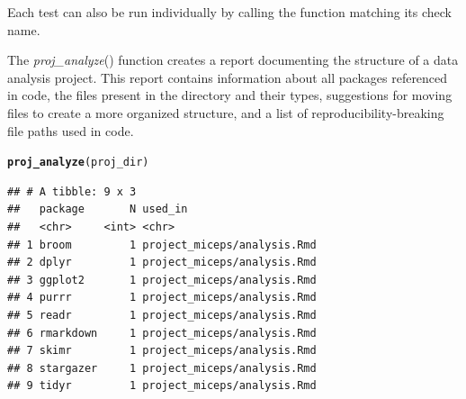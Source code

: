 \documentclass[APA,LATO1COL]{WileyNJD-v2}\usepackage[]{graphicx}\usepackage[]{color}
\makeatletter
\newcommand{\hlstd}[1]{\textcolor[rgb]{0.345,0.345,0.345}{#1}}%
\newcommand{\hlkwd}[1]{\textcolor[rgb]{0.737,0.353,0.396}{\textbf{#1}}}%
\newenvironment{kframe}{%
 \def\at@end@of@kframe{}%
 \ifinner\ifhmode%
  \def\at@end@of@kframe{\end{minipage}}%
  \begin{minipage}{\columnwidth}%
 \fi\fi%
 \def\FrameCommand##1{\hskip\@totalleftmargin \hskip-\fboxsep
 \colorbox{shadecolor}{##1}\hskip-\fboxsep
     \hskip-\linewidth \hskip-\@totalleftmargin \hskip\columnwidth}%
 \MakeFramed {\advance\hsize-\width
   \@totalleftmargin\z@ \linewidth\hsize
   \@setminipage}}%
 {\par\unskip\endMakeFramed%
 \at@end@of@kframe}
\newenvironment{knitrout}{}{} %
\newcommand{\func}[1]{\textit{#1}()}
\makeatother
\begin{document}
Each test can also be run individually by calling the function matching its check name.

The \func{proj\_analyze} function creates a report documenting the structure of a data analysis project. This report contains information about all packages referenced in code, the files present in the directory and their types, suggestions for moving files to create a more organized structure, and a list of reproducibility-breaking file paths used in code.

\begin{knitrout}
\color{fgcolor}\begin{kframe}
\begin{alltt}
\hlkwd{proj_analyze}\hlstd{(proj_dir)}
\end{alltt}


{\ttfamily\noindent\itshape\color{messagecolor}{\#\# -- Analysis of reproducibility for project\_miceps ------------ fertile 0.0.0.9027 --}}

{\ttfamily\noindent\itshape\color{messagecolor}{\#\# --\ \  Packages referenced in source code ---------------------- fertile 0.0.0.9027 --}}\begin{verbatim}
## # A tibble: 9 x 3
##   package       N used_in                    
##   <chr>     <int> <chr>                      
## 1 broom         1 project_miceps/analysis.Rmd
## 2 dplyr         1 project_miceps/analysis.Rmd
## 3 ggplot2       1 project_miceps/analysis.Rmd
## 4 purrr         1 project_miceps/analysis.Rmd
## 5 readr         1 project_miceps/analysis.Rmd
## 6 rmarkdown     1 project_miceps/analysis.Rmd
## 7 skimr         1 project_miceps/analysis.Rmd
## 8 stargazer     1 project_miceps/analysis.Rmd
## 9 tidyr         1 project_miceps/analysis.Rmd
\end{verbatim}



\end{kframe}
\end{knitrout}
\end{document}
